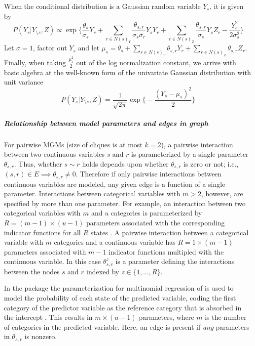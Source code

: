 When the conditional distribution is a Gaussian random variable $Y_s$, it is given by
\begin{equation} \label{gaussCond}
    P(Y_s|Y_{\setminus s},Z) \propto \exp \Bigg\{\frac{\theta_s}{\sigma_s} Y_s + \sum_{r \in N(s)_{Y}} \frac{\theta_{s,r}}{\sigma_s \sigma_r} Y_s Y_r + \sum_{r \in N(s)_{Z}} \frac{\theta_{s,r}}{\sigma_s} Y_s Z_r - \frac{Y_{s}^{2}}{2\sigma_{s}^{2}} \Bigg\}
\end{equation}
Let $\sigma=1$, factor out $Y_s$ and let $\mu_s = \theta_s + \sum_{r \in N(s)_{Y}} \theta_{s,r} Y_r + \sum_{r \in N(s)_{Z}} \theta_{s,r} Z_r$. Finally, when taking $\frac{\mu_{s}^{2}}{2}$ out of the log normalization constant, we arrive with basic algebra at the well-known form of the univariate Gaussian distribution with unit variance
\begin{equation} \label{uniGauss}
    P(Y_s|Y_{\setminus s},Z) = \frac{1}{\sqrt{2 \pi}} \exp \bigg\{-\frac{(Y_s - \mu_s)^2}{2} \bigg\}
\end{equation}


\subparagraph{Relationship between model parameters and edges in graph}
For pairwise MGMs (size of cliques is at most $k=2$), a pairwise interaction between two continuous variables $s$ and $r$ is parameterized by a single parameter $\theta_{s,r}$. Thus, whether $s \sim r$ holds depends upon whether $\theta_{s,r}$ is zero or not; i.e., $(s,r) \in E \implies \theta_{s,r} \neq 0$. Therefore if only pairwise interactions between continuous variables are modeled, any given edge is a function of a single parameter. Interactions between categorical variables with $m > 2$, however, are specified by more than one parameter. For example, an interaction between two categorical variables with $m$ and $u$ categories is parameterized by $R=(m-1) \times (u - 1)$ parameters associated with the corresponding indicator functions for all $R$ states \cite{agresti2003cat}. A pairwise interaction between a categorical variable with $m$ categories and a continuous variable has $R=1 \times (m-1)$ parameters associated with $m-1$ indicator functions multipled with the continuous variable. In this case $\theta_{s,r}^{z}$ is a parameter defining the interactions between the nodes $s$ and $r$ indexed by $z \in \{1,\ldots,R\}$. 

In the  package the parameterization for multinomial regression of  is used to model the probability of each state of the predicted variable, coding the first category of the predictor variable as the reference category that is absorbed in the intercept \cite{friedman2010bregularization}. This results in $m \times (u-1)$ parameters, where $m$ is the number of categories in the predicted variable. Here, an edge is present if \textit{any} parameters in $\theta_{s,r}$ is nonzero.

